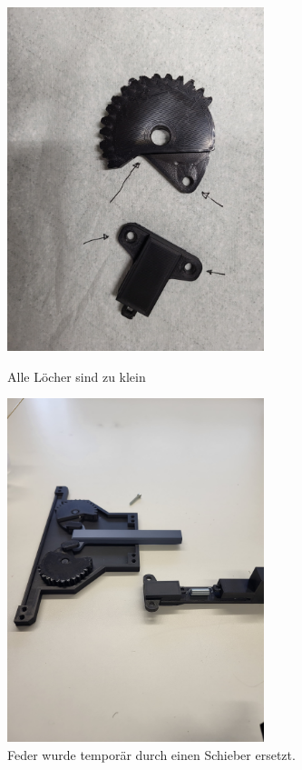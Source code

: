 \documentclass[../main.tex]{subfiles}
\begin{document}
\newpage
\begin{figure}[h!]
    \centering
    \begin{minipage}[t]{0.45\textwidth}
        \centering
        \includegraphics[height=10cm]{img/greifarmtest/prototyp_test_loecher.jpeg}
        \caption{Alle Löcher sind zu klein}
        \label{fig:hardware_test_loecher}
    \end{minipage}%
    \hfill
    \begin{minipage}[t]{0.45\textwidth}
        \centering
        \includegraphics[height=10cm]{img/greifarmtest/prototyp_test_schieber.jpeg}
        \caption{Feder wurde temporär durch einen Schieber ersetzt.}
        \label{fig:hardware_test_schieber}
    \end{minipage}
\end{figure}
\end{document}
